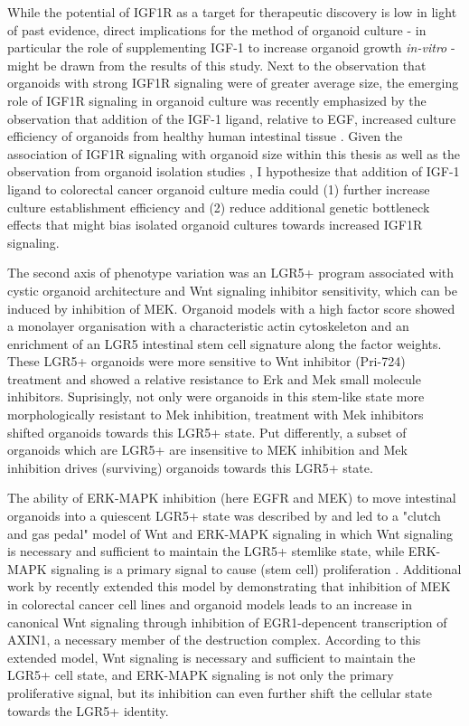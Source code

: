\begin{flushleft}
While the potential of IGF1R as a target for therapeutic discovery is low in light of past evidence, direct implications for the method of organoid culture - in particular the role of supplementing IGF-1 to increase organoid growth \textit{in-vitro} - might be drawn from the results of this study. Next to the observation that organoids with strong IGF1R signaling were of greater average size, the emerging role of IGF1R signaling in organoid culture was recently emphasized by the observation that addition of the IGF-1 ligand, relative to EGF, increased culture efficiency of organoids from healthy human intestinal tissue \parencite{fujiiHumanIntestinalOrganoids2018a}. Given the association of IGF1R signaling with organoid size within this thesis as well as the observation from organoid isolation studies \parencite{fujiiHumanIntestinalOrganoids2018a}, I hypothesize that addition of IGF-1 ligand to colorectal cancer organoid culture media could (1) further increase culture establishment efficiency and (2) reduce additional genetic bottleneck effects that might bias isolated organoid cultures towards increased IGF1R signaling.
\smallbreak

The second axis of phenotype variation was an LGR5+ program associated with cystic organoid architecture and Wnt signaling inhibitor sensitivity, which can be induced by inhibition of MEK. Organoid models with a high factor score showed a monolayer organisation with a characteristic actin cytoskeleton and an enrichment of an LGR5 intestinal stem cell signature along the factor weights. These LGR5+ organoids were more sensitive to Wnt inhibitor (Pri-724) treatment and showed a relative resistance to Erk and Mek small molecule inhibitors. Suprisingly, not only were organoids in this stem-like state more morphologically resistant to Mek inhibition, treatment with Mek inhibitors shifted organoids towards this LGR5+ state. Put differently, a subset of organoids which are LGR5+ are insensitive to MEK inhibition and Mek inhibition drives (surviving) organoids towards this LGR5+ state.
\smallbreak

The ability of ERK-MAPK inhibition (here EGFR and MEK) to move intestinal organoids into a quiescent LGR5+ state was described by \parencite{basakInducedQuiescenceLgr52017} and led to a "clutch and gas pedal" model of Wnt and ERK-MAPK signaling in which Wnt signaling is necessary and sufficient to maintain the LGR5+ stemlike state, while ERK-MAPK signaling is a primary signal to cause (stem cell) proliferation \parencite{basakInducedQuiescenceLgr52017}. Additional work by \parencite{zhanMEKInhibitorsActivate2019a} recently extended this model by demonstrating that inhibition of MEK in colorectal cancer cell lines and organoid models leads to an increase in canonical Wnt signaling through inhibition of EGR1-depencent transcription of AXIN1, a necessary member of the destruction complex. According to this extended model, Wnt signaling is necessary and sufficient to maintain the LGR5+ cell state, and ERK-MAPK signaling is not only the primary proliferative signal, but its inhibition can even further shift the cellular state towards the LGR5+ identity. 


\end{flushleft}
